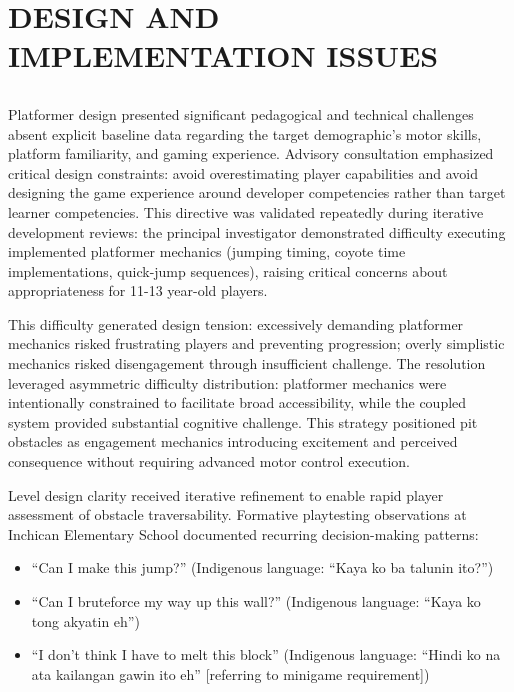 \chapter{DESIGN AND IMPLEMENTATION ISSUES}

\section{\texorpdfstring{}{Platformer Mechanics}}

Platformer design presented significant pedagogical and technical challenges absent explicit baseline data regarding the target demographic's motor skills, platform familiarity, and gaming experience. Advisory consultation emphasized critical design constraints: avoid overestimating player capabilities and avoid designing the game experience around developer competencies rather than target learner competencies. This directive was validated repeatedly during iterative development reviews: the principal investigator demonstrated difficulty executing implemented platformer mechanics (jumping timing, coyote time implementations, quick-jump sequences), raising critical concerns about appropriateness for 11-13 year-old players.

This difficulty generated design tension: excessively demanding platformer mechanics risked frustrating players and preventing progression; overly simplistic mechanics risked disengagement through insufficient challenge. The resolution leveraged asymmetric difficulty distribution: platformer mechanics were intentionally constrained to facilitate broad accessibility, while the coupled  system provided substantial cognitive challenge. This strategy positioned pit obstacles as engagement mechanics introducing excitement and perceived consequence without requiring advanced motor control execution.

Level design clarity received iterative refinement to enable rapid player assessment of obstacle traversability. Formative playtesting observations at Inchican Elementary School documented recurring decision-making patterns:

\begin{itemize}
\item ``Can I make this jump?'' (Indigenous language: ``Kaya ko ba talunin ito?'')
\item ``Can I bruteforce my way up this wall?'' (Indigenous language: ``Kaya ko tong akyatin eh'')
\item ``I don't think I have to melt this block'' (Indigenous language: ``Hindi ko na ata kailangan gawin ito eh'' [referring to minigame requirement])
\end{itemize}

